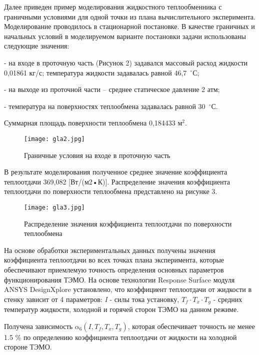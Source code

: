 Далее приведен пример моделирования жидкостного теплообменника с граничными условиями для одной точки из плана вычислительного эксперимента. Моделирование проводилось в стационарной постановке. В качестве граничных и начальных условий в моделируемом варианте постановки задачи использованы следующие значения:

- на входе в проточную часть (Рисунок 2) задавался массовый расход жидкости 0,01861 кг/с;
температура жидкости задавалась равной 46,7~$^\circ$С;

- на выходе из проточной части – среднее статическое давление 2 атм;

- температура на поверхностях теплообмена задавалась равной 30~$^\circ$С.

Суммарная площадь поверхности теплообмена 0,184433 м$^2$.

\begin{figure}
	\centering
	\texttt{[image: gla2.jpg]}
	\caption{Граничные условия на входе в проточную часть}
\end{figure}

В результате моделирования полученное среднее значение коэффициента теплоотдачи 369,082 [Вт/(м2•К)]. Распределение значения коэффициента теплоотдачи по поверхности теплообмена представлено на рисунке 3.

\begin{figure}
	\centering
	\texttt{[image: gla3.jpg]}
	\caption{Распределение значения коэффициента теплоотдачи по поверхности теплообмена}
\end{figure}


На основе обработки экспериментальных данных получены значения коэффициента теплоотдачи во всех точках плана эксперимента, которые обеспечивают приемлемую точность определения основных параметров функционирования ТЭМО. На основе технологии Response Surface модуля ANSYS DesignXplore установлено, что коэффициент теплоотдачи от жидкости в стенку зависит от 4 параметров: \textit{I} - силы тока установку, $T_{f} \cdot T_{x} \cdot T_{g} $ - средних температур жидкости, холодной и горячей сторон ТЭМО на данном режиме.

Получена зависимость $\alpha _{6} (I,T_{f} ,T_{x} ,T_{g} )$, которая обеспечивает точность не менее 1.5 \% по определению коэффициента теплоотдачи от жидкости на холодной стороне ТЭМО.


